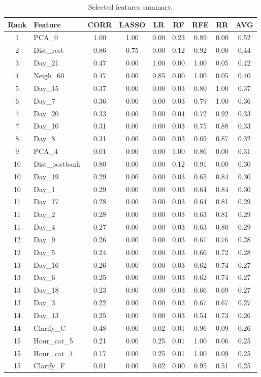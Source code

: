 \documentclass[thesis=M,english]{FITthesis}[2012/10/20]
\begin{document}
\begin{table}\centering
    \begin{scriptsize}
    \caption{Selected features summary.}\label{tab:fs_result}
    \begin{tabular}{|c|l|c|c|c|c|c|c|c|}\hline
Rank & Feature & CORR & LASSO & LR & RF & RFE & RR & AVG\tabularnewline\hline\hline
1 & PCA\_0 & 1.00 & 1.00 & 0.00 & 0.23 & 0.89 & 0.00 & 0.52\tabularnewline\hline 
2 & Dist\_rest & 0.86 & 0.75 & 0.00 & 0.12 & 0.92 & 0.00 & 0.44\tabularnewline\hline 
3 & Day\_21 & 0.47 & 0.00 & 1.00 & 0.00 & 1.00 & 0.05 & 0.42\tabularnewline\hline 
4 & Neigh\_60 & 0.47 & 0.00 & 0.85 & 0.00 & 1.00 & 0.05 & 0.40\tabularnewline\hline 
5 & Day\_15 & 0.37 & 0.00 & 0.00 & 0.03 & 0.80 & 1.00 & 0.37\tabularnewline\hline 
6 & Day\_7 & 0.36 & 0.00 & 0.00 & 0.03 & 0.79 & 1.00 & 0.36\tabularnewline\hline 
7 & Day\_20 & 0.33 & 0.00 & 0.00 & 0.04 & 0.72 & 0.92 & 0.33\tabularnewline\hline 
7 & Day\_10 & 0.31 & 0.00 & 0.00 & 0.03 & 0.75 & 0.88 & 0.33\tabularnewline\hline 
8 & Day\_8 & 0.31 & 0.00 & 0.00 & 0.03 & 0.69 & 0.87 & 0.32\tabularnewline\hline 
9 & PCA\_4 & 0.01 & 0.00 & 0.00 & 1.00 & 0.86 & 0.00 & 0.31\tabularnewline\hline 
10 & Dist\_postbank & 0.80 & 0.00 & 0.00 & 0.12 & 0.91 & 0.00 & 0.30\tabularnewline\hline 
10 & Day\_19 & 0.29 & 0.00 & 0.00 & 0.03 & 0.65 & 0.84 & 0.30\tabularnewline\hline 
10 & Day\_1 & 0.29 & 0.00 & 0.00 & 0.03 & 0.64 & 0.84 & 0.30\tabularnewline\hline 
11 & Day\_17 & 0.28 & 0.00 & 0.00 & 0.03 & 0.64 & 0.81 & 0.29\tabularnewline\hline 
11 & Day\_2 & 0.28 & 0.00 & 0.00 & 0.03 & 0.63 & 0.81 & 0.29\tabularnewline\hline 
11 & Day\_4 & 0.27 & 0.00 & 0.00 & 0.03 & 0.63 & 0.80 & 0.29\tabularnewline\hline 
12 & Day\_9 & 0.26 & 0.00 & 0.00 & 0.03 & 0.61 & 0.76 & 0.28\tabularnewline\hline 
12 & Day\_5 & 0.24 & 0.00 & 0.00 & 0.03 & 0.66 & 0.72 & 0.28\tabularnewline\hline 
13 & Day\_16 & 0.26 & 0.00 & 0.00 & 0.03 & 0.62 & 0.74 & 0.27\tabularnewline\hline 
13 & Day\_6 & 0.25 & 0.00 & 0.00 & 0.03 & 0.62 & 0.74 & 0.27\tabularnewline\hline 
13 & Day\_18 & 0.23 & 0.00 & 0.00 & 0.03 & 0.66 & 0.69 & 0.27\tabularnewline\hline 
13 & Day\_3 & 0.22 & 0.00 & 0.00 & 0.03 & 0.67 & 0.67 & 0.27\tabularnewline\hline 
14 & Day\_13 & 0.25 & 0.00 & 0.00 & 0.03 & 0.54 & 0.73 & 0.26\tabularnewline\hline 
14 & Clarify\_C & 0.48 & 0.00 & 0.02 & 0.01 & 0.96 & 0.09 & 0.26\tabularnewline\hline 
15 & Hour\_cat\_5 & 0.21 & 0.00 & 0.25 & 0.01 & 1.00 & 0.06 & 0.25\tabularnewline\hline 
15 & Hour\_cat\_4 & 0.17 & 0.00 & 0.25 & 0.01 & 1.00 & 0.09 & 0.25\tabularnewline\hline 
15 & Clarify\_F & 0.01 & 0.00 & 0.02 & 0.00 & 0.95 & 0.51 & 0.25\tabularnewline\hline 

\end{tabular}
\end{scriptsize}
\end{table}
\end{document}
